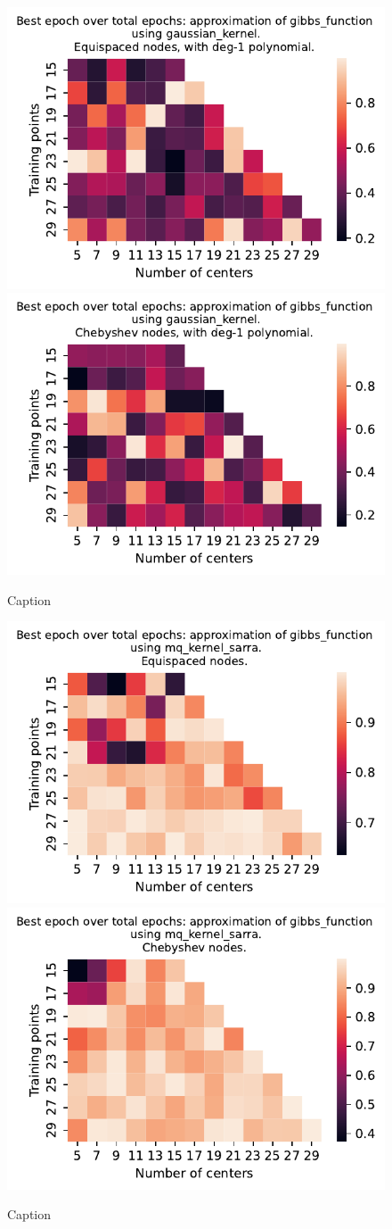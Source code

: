 \documentclass[12pt]{report} %
\begin{document}
\begin{figure}[ht]
  \centering

  \includegraphics[width=.49\textwidth]{imagenes/experiments/1d/variational_epochs/gibbs_function-Kgaussian_kernel-Poly-Equi-epochs.pdf}
  \includegraphics[width=.49\textwidth]{imagenes/experiments/1d/variational_epochs/gibbs_function-Kgaussian_kernel-Poly-Cheb-epochs.pdf}
  \caption{Caption}
  \label{fig:epochs-gibbs-gaussian-poly}
\end{figure}

\begin{figure}[ht]
  \centering

  \includegraphics[width=.49\textwidth]{imagenes/experiments/1d/variational_epochs/gibbs_function-Kmq_kernel_sarra-Equi-epochs.pdf}
  \includegraphics[width=.49\textwidth]{imagenes/experiments/1d/variational_epochs/gibbs_function-Kmq_kernel_sarra-Cheb-epochs.pdf}
  \caption{Caption}
  \label{fig:epochs-gibbs-sarra}
\end{figure}
\end{document}
